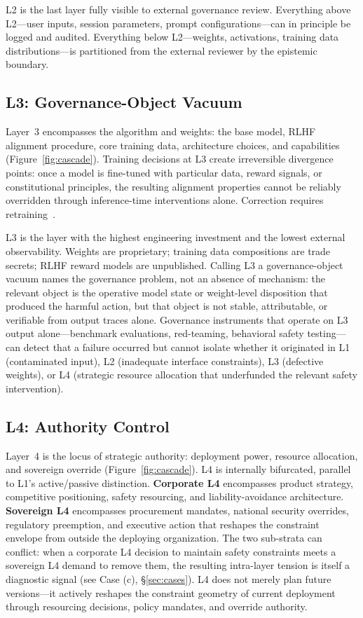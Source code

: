 L2 is the last layer fully visible to external governance review. Everything above L2---user inputs, session parameters, prompt configurations---can in principle be logged and audited. Everything below L2---weights, activations, training data distributions---is partitioned from the external reviewer by the epistemic boundary.

\subsection{L3: Governance-Object Vacuum}

Layer~3 encompasses the algorithm and weights: the base model, RLHF alignment procedure, core training data, architecture choices, and capabilities (Figure~\ref{fig:cascade}). Training decisions at L3 create irreversible divergence points: once a model is fine-tuned with particular data, reward signals, or constitutional principles, the resulting alignment properties cannot be reliably overridden through inference-time interventions alone. Correction requires retraining~\cite{wei2024jailbroken, greshake2023not}.

L3 is the layer with the highest engineering investment and the lowest external observability. Weights are proprietary; training data compositions are trade secrets; RLHF reward models are unpublished. Calling L3 a governance-object vacuum names the governance problem, not an absence of mechanism: the relevant object is the operative model state or weight-level disposition that produced the harmful action, but that object is not stable, attributable, or verifiable from output traces alone. Governance instruments that operate on L3 output alone---benchmark evaluations, red-teaming, behavioral safety testing---can detect that a failure occurred but cannot isolate whether it originated in L1 (contaminated input), L2 (inadequate interface constraints), L3 (defective weights), or L4 (strategic resource allocation that underfunded the relevant safety intervention).

\subsection{L4: Authority Control}

Layer~4 is the locus of strategic authority: deployment power, resource allocation, and sovereign override (Figure~\ref{fig:cascade}). L4 is internally bifurcated, parallel to L1's active/passive distinction. \textbf{Corporate L4} encompasses product strategy, competitive positioning, safety resourcing, and liability-avoidance architecture. \textbf{Sovereign L4} encompasses procurement mandates, national security overrides, regulatory preemption, and executive action that reshapes the constraint envelope from outside the deploying organization. The two sub-strata can conflict: when a corporate L4 decision to maintain safety constraints meets a sovereign L4 demand to remove them, the resulting intra-layer tension is itself a diagnostic signal (see Case (c), \S\ref{sec:cases}). L4 does not merely plan future versions---it actively reshapes the constraint geometry of current deployment through resourcing decisions, policy mandates, and override authority.

